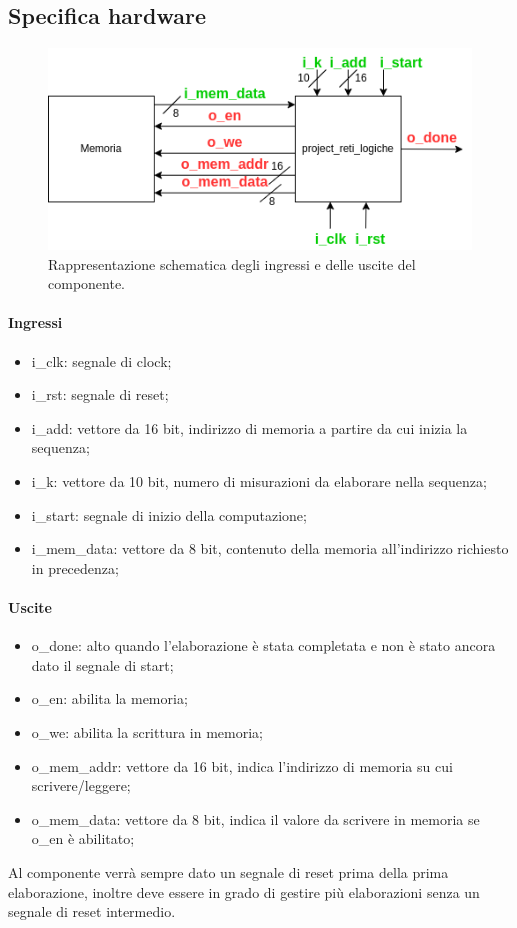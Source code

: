 \documentclass[12pt,a4paper]{scrartcl}
\begin{document}
\newpage
\subsection{Specifica hardware}
\begin{figure}[htbp]
  \centering
  \includegraphics[width=0.8\linewidth]{base_component.drawio.png}
  \caption{Rappresentazione schematica degli ingressi e delle uscite del componente.}
  \label{fig:componente}
\end{figure}

\paragraph{Ingressi} 
    \begin{itemize}
        \item i\_clk: segnale di clock;
        \item i\_rst: segnale di reset;
        \item i\_add: vettore da 16 bit, indirizzo di memoria a partire da cui inizia la sequenza;
        \item i\_k: vettore da 10 bit, numero di misurazioni da elaborare nella sequenza;
        \item i\_start: segnale di inizio della computazione; 
        \item i\_mem\_data: vettore da 8 bit, contenuto della memoria all'indirizzo richiesto in precedenza; 
    \end{itemize}
\paragraph{Uscite} 
    \begin{itemize}
        \item o\_done: alto quando l'elaborazione è stata completata e non è stato ancora dato il segnale di start;
        \item o\_en: abilita la memoria;
        \item o\_we: abilita la scrittura in memoria;
        \item o\_mem\_addr: vettore da 16 bit, indica l'indirizzo di memoria su cui scrivere/leggere;
        \item o\_mem\_data: vettore da 8 bit, indica il valore da scrivere in memoria se o\_en è abilitato;
    \end{itemize}
Al componente verrà sempre dato un segnale di reset prima della prima elaborazione, inoltre deve essere in grado di gestire più elaborazioni senza un segnale di reset intermedio.
\newpage
\end{document}
